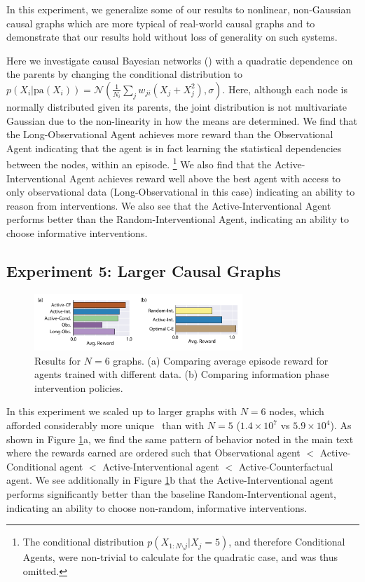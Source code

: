 In this experiment, we generalize some of our results to nonlinear, non-Gaussian causal graphs which are more typical of real-world causal graphs and to demonstrate that our results hold without loss of generality on such systems. 

Here we investigate causal Bayesian networks (\CBNs) with a quadratic dependence on the parents by changing the conditional distribution to $p(X_{i}|\textrm{pa}(X_{i})) = \mathcal{N}(\frac{1}{N_{i}} \sum_{j} w_{ji}(X_{j} + X_{j}^2), \sigma)$. Here, although each node is normally distributed given its parents, the joint distribution is not multivariate Gaussian due to the non-linearity in how the means are determined. We find that the Long-Observational Agent achieves more reward than the Observational Agent indicating that the agent is in fact learning the statistical dependencies between the nodes, within an episode.
\footnote{The conditional distribution $p(X_{1:N\setminus j }|X_j=5)$, and therefore Conditional Agents, were non-trivial to calculate for the quadratic case, and was thus omitted.}
We also find that the Active-Interventional Agent achieves reward well above the best agent with access to only observational data (Long-Observational in this case) indicating an ability to reason from interventions. We also see that the Active-Interventional Agent performs better than the Random-Interventional Agent, indicating an ability to choose informative interventions.


\subsection{Experiment 5: Larger Causal Graphs}

\begin{figure}[ht!]
\centering
\includegraphics[width=0.7\textwidth]{figures/N6_results_active.pdf} 
\caption{Results for $N=6$ graphs. (a) Comparing average episode reward for agents trained with different data. (b) Comparing information phase intervention policies. }
\label{fig:N6_results}
\end{figure}
In this experiment we scaled up to larger graphs with $N=6$ nodes, which afforded considerably more unique \CBNs~than with $N=5$ ($1.4\times10^7$ vs $5.9\times10^4$). As shown in Figure \ref{fig:N6_results}a, we find the same pattern of behavior noted in the main text where the rewards earned are ordered such that Observational agent $<$ Active-Conditional agent $<$ Active-Interventional agent $<$ Active-Counterfactual agent. We see additionally in Figure \ref{fig:N6_results}b that the Active-Interventional agent performs significantly better than the baseline Random-Interventional agent, indicating an ability to choose non-random, informative interventions.




